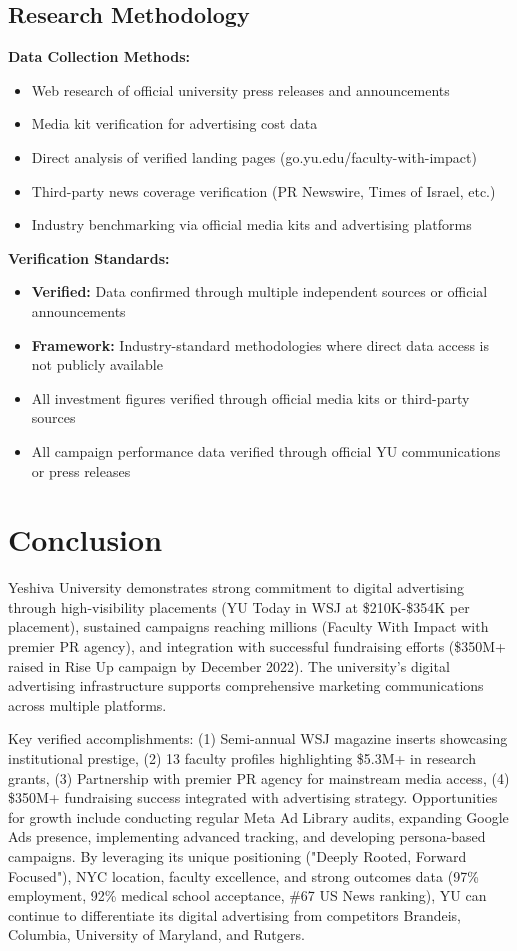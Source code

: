 \documentclass[12pt,letterpaper]{article}
\begin{document}
\subsection{Research Methodology}

\textbf{Data Collection Methods:}
\begin{itemize}[leftmargin=*]
    \item Web research of official university press releases and announcements
    \item Media kit verification for advertising cost data
    \item Direct analysis of verified landing pages (go.yu.edu/faculty-with-impact)
    \item Third-party news coverage verification (PR Newswire, Times of Israel, etc.)
    \item Industry benchmarking via official media kits and advertising platforms
\end{itemize}

\textbf{Verification Standards:}
\begin{itemize}[leftmargin=*]
    \item \textbf{Verified:} Data confirmed through multiple independent sources or official announcements
    \item \textbf{Framework:} Industry-standard methodologies where direct data access is not publicly available
    \item All investment figures verified through official media kits or third-party sources
    \item All campaign performance data verified through official YU communications or press releases
\end{itemize}

\section{Conclusion}

Yeshiva University demonstrates strong commitment to digital advertising through high-visibility placements (YU Today in WSJ at \$210K-\$354K per placement), sustained campaigns reaching millions (Faculty With Impact with premier PR agency), and integration with successful fundraising efforts (\$350M+ raised in Rise Up campaign by December 2022). The university's digital advertising infrastructure supports comprehensive marketing communications across multiple platforms.

Key verified accomplishments: (1) Semi-annual WSJ magazine inserts showcasing institutional prestige, (2) 13 faculty profiles highlighting \$5.3M+ in research grants, (3) Partnership with premier PR agency for mainstream media access, (4) \$350M+ fundraising success integrated with advertising strategy. Opportunities for growth include conducting regular Meta Ad Library audits, expanding Google Ads presence, implementing advanced tracking, and developing persona-based campaigns. By leveraging its unique positioning ("Deeply Rooted, Forward Focused"), NYC location, faculty excellence, and strong outcomes data (97\% employment, 92\% medical school acceptance, \#67 US News ranking), YU can continue to differentiate its digital advertising from competitors Brandeis, Columbia, University of Maryland, and Rutgers.
\end{document}
